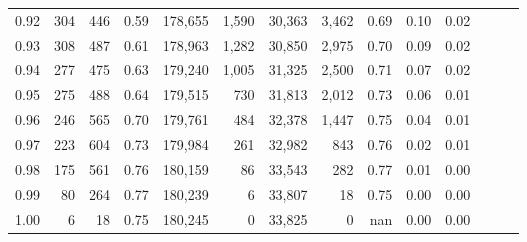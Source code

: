 \begin{tabular}{rrrrrrrrrrrrrr}
0.92 &    304 &  446 &  0.59 &  178,655 &    1,590 &  30,363 &   3,462 &  0.69 &  0.10 &      0.02 \\
0.93 &    308 &  487 &  0.61 &  178,963 &    1,282 &  30,850 &   2,975 &  0.70 &  0.09 &      0.02 \\
0.94 &    277 &  475 &  0.63 &  179,240 &    1,005 &  31,325 &   2,500 &  0.71 &  0.07 &      0.02 \\
0.95 &    275 &  488 &  0.64 &  179,515 &      730 &  31,813 &   2,012 &  0.73 &  0.06 &      0.01 \\
0.96 &    246 &  565 &  0.70 &  179,761 &      484 &  32,378 &   1,447 &  0.75 &  0.04 &      0.01 \\
0.97 &    223 &  604 &  0.73 &  179,984 &      261 &  32,982 &     843 &  0.76 &  0.02 &      0.01 \\
0.98 &    175 &  561 &  0.76 &  180,159 &       86 &  33,543 &     282 &  0.77 &  0.01 &      0.00 \\
0.99 &     80 &  264 &  0.77 &  180,239 &        6 &  33,807 &      18 &  0.75 &  0.00 &      0.00 \\
1.00 &      6 &   18 &  0.75 &  180,245 &        0 &  33,825 &       0 &   nan &  0.00 &      0.00 \\
\bottomrule
\end{tabular}
